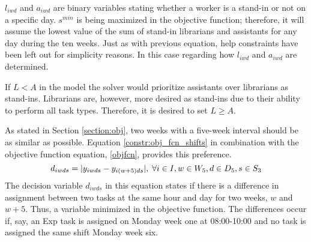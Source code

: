 $l_{iwd}$ and $a_{iwd}$ are binary variables stating whether a worker is a stand-in or not on a specific day. $s^{min}$ is being maximized in the objective function; therefore, it will assume the lowest value of the sum of stand-in librarians and assistants for any day during the ten weeks. Just as with previous equation, help constraints have been left out for simplicity reasons. In this case regarding how $l_{iwd}$ and $a_{iwd}$ are determined.

If $L < A$ in the model the solver would prioritize assistants over librarians as stand-ins. Librarians are, however, more desired as stand-ins due to their ability to perform all task types. Therefore, it is desired to set $L \geq A$.

As stated in Section \ref{section:obj}, two weeks with a five-week interval should be as similar as possible. Equation \ref{constr:obj_fcn_shifts} in combination with the objective function equation, \ref{objfcn}, provides this preference.
\begin{equation} \label{constr:obj_fcn_shifts}
d_{iwds} = \lvert y_{iwds} - y_{i(w+5)ds}\rvert, \; \forall i \in I, w \in W_5, d \in D_5, s \in S_3
\end{equation}
The decision variable $d_{iwds}$ in this equation states if there is a difference in assignment between two tasks at the same hour and day for two weeks, $w$ and $w+5$. Thus, a variable minimized in the objective function. The differences occur if, say, an Exp task is assigned on Monday week one at 08:00-10:00 and no task is assigned the same shift Monday week six.

